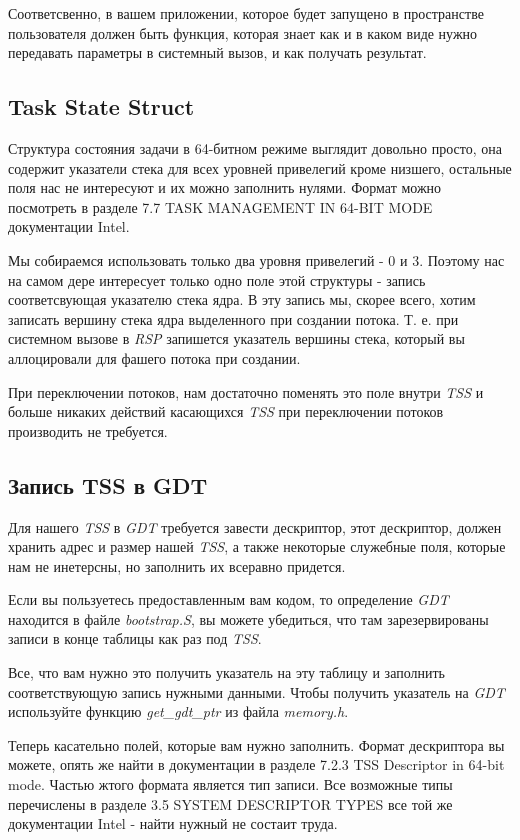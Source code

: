 Соответсвенно, в вашем приложении, которое будет запущено в пространстве пользователя
должен быть функция, которая знает как и в каком виде нужно передавать параметры
в системный вызов, и как получать результат.

\subsection{Task State Struct}

Структура состояния задачи в 64-битном режиме выглядит довольно просто, она содержит
указатели стека для всех уровней привелегий кроме низшего, остальные поля нас не
интересуют и их можно заполнить нулями. Формат можно посмотреть в разделе
7.7 TASK MANAGEMENT IN 64-BIT MODE документации Intel.

Мы собираемся использовать только два уровня привелегий - 0 и 3. Поэтому нас на
самом дере интересует только одно поле этой структуры - запись соответсвующая
указателю стека ядра. В эту запись мы, скорее всего, хотим записать вершину
стека ядра выделенного при создании потока. Т. е. при системном вызове в \emph{RSP}
запишется указатель вершины стека, который вы аллоцировали для фашего потока при
создании.

При переключении потоков, нам достаточно поменять это поле внутри \emph{TSS} и
больше никаких действий касающихся \emph{TSS} при переключении потоков производить
не требуется.

\subsection{Запись TSS в GDT}

Для нашего \emph{TSS} в \emph{GDT} требуется завести дескриптор, этот дескриптор,
должен хранить адрес и размер нашей \emph{TSS}, а также некоторые служебные поля,
которые нам не инетерсны, но заполнить их всеравно придется.

Если вы пользуетесь предоставленным вам кодом, то определение \emph{GDT} находится
в файле \emph{bootstrap.S}, вы можете убедиться, что там зарезервированы записи в
конце таблицы как раз под \emph{TSS}.

Все, что вам нужно это получить указатель на эту таблицу и заполнить соответствующую
запись нужными данными. Чтобы получить указатель на \emph{GDT} используйте функцию
\emph{get\_gdt\_ptr} из файла \emph{memory.h}.

Теперь касательно полей, которые вам нужно заполнить. Формат дескриптора вы можете,
опять же найти в документации в разделе 7.2.3 TSS Descriptor in 64-bit mode. Частью
жтого формата является тип записи. Все возможные типы перечислены в разделе 3.5
SYSTEM DESCRIPTOR TYPES все той же документации Intel - найти нужный не состаит
труда.

